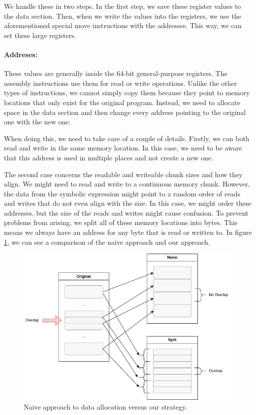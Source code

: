 We handle these in two steps.
In the first step, we save these register values to the data section.
Then, when we write the values into the registers, we use the aforementioned special move instructions with the addresses.
This way, we can set these large registers.

\paragraph{Addreses:}
These values are generally inside the 64-bit general-purpose registers.
The assembly instructions use them for read or write operations.
Unlike the other types of instructions, we cannot simply copy them because they point to memory locations that only exist for the original program.
Instead, we need to allocate space in the data section and then change every address pointing to the original one with the new one.

When doing this, we need to take care of a couple of details.
Firstly, we can both read and write in the same memory location.
In this case, we need to be aware that this address is used in multiple places and not create a new one.

The second case concerns the readable and writeable chunk sizes and how they align.
We might need to read and write to a continuous memory chunk.
However, the data from the symbolic expression might point to a random order of reads and writes that do not even align with the size.
In this case, we might order these addresses, but the size of the reads and writes might cause confusion.
To prevent problems from arising, we split all of these memory locations into bytes.
This means we always have an address for any byte that is read or written to.
In figure \ref{fig:addr_match}, we can see a comparison of the naive approach and our approach.

\begin{figure}[ht]
    \centering
    \includegraphics[width=0.8\linewidth]{figures/alloc2}
    \caption{Naive approach to data allocation versus our strategy.}
    \label{fig:addr_match}
\end{figure}

